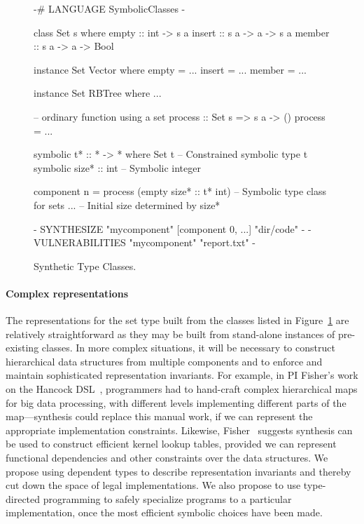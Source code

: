 \begin{figure}[t]
\centering
\begin{mylisting}
{-# LANGUAGE SymbolicClasses -}

class Set s where
  empty :: int -> s a
  insert :: s a -> a -> s a
  member :: s a -> a -> Bool

instance Set Vector where
  empty = ...
  insert = ...
  member = ...

instance Set RBTree where
  ...

-- ordinary function using a set
process :: Set s => s a -> ()
process = ...

symbolic t* :: * -> * where Set t   -- Constrained symbolic type t
symbolic size* :: int               -- Symbolic integer

component n =
  process (empty size* :: t* int)   -- Symbolic type class for sets
  ...                               -- Initial size determined by size*

{- SYNTHESIZE "mycomponent" [component 0, ...]  "dir/code" -}
{- VULNERABILITIES "mycomponent" "report.txt" -}

\end{mylisting}
\caption{Synthetic Type Classes.}
\label{fig:type-class-set}
\end{figure}

\paragraph*{Complex representations}

The representations for the set type built from the classes listed in
Figure~\ref{fig:type-class-set} are relatively straightforward as they
may be built from stand-alone instances of pre-existing classes.  In
more complex situations, it will be necessary to construct
hierarchical data structures from multiple components and to enforce
and maintain sophisticated representation invariants.  For example,
in PI Fisher's work on the Hancock DSL~\cite{hancock}, programmers had to hand-craft
complex hierarchical maps for big data processing, with different levels
implementing different parts of the map---synthesis could
replace this manual work, if we can represent the appropriate implementation
constraints.  Likewise, Fisher~\cite{data-rep-synth}
suggests synthesis can be used to construct efficient kernel lookup tables,
provided we can represent functional dependencies and other constraints
over the data structures.  We propose
using dependent types to describe representation invariants and thereby
cut down the space of legal implementations.  We also propose to use
type-directed programming to safely specialize programs to a particular
implementation, once the most efficient symbolic choices have been made.

